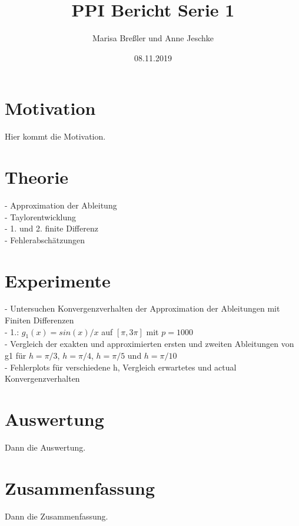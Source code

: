\documentclass{scrartcl}
\begin{document}
\title{PPI Bericht Serie 1}
\author{Marisa Breßler und Anne Jeschke}
\date{08.11.2019}
\maketitle
\tableofcontents
\section{Motivation}
\label{sec:motivation}
Hier kommt die Motivation.

\section{Theorie}
\label{sec:theorie}
- Approximation der Ableitung\\
- Taylorentwicklung\\
- 1. und 2. finite Differenz\\
- Fehlerabschätzungen

\section{Experimente}
\label{sec:experiment}
- Untersuchen Konvergenzverhalten der Approximation der Ableitungen mit Finiten Differenzen\\
- 1.: $g_1(x)=sin(x)/x$ auf $[\pi,3\pi]$ mit $p=1000$\\
- Vergleich der exakten und approximierten ersten und zweiten Ableitungen von g1 für $h = \pi/3$, $h = \pi/4$, $h = \pi/5$ und $h = \pi/10$\\
- Fehlerplots für verschiedene h, Vergleich erwartetes und actual Konvergenzverhalten\\

\section{Auswertung}
\label{sec:auswertung}
Dann die Auswertung.
\section{Zusammenfassung}
\label{sec:zusammenfassung}
Dann die Zusammenfassung.
\end{document}
